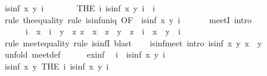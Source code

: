 \begin{isabellebody}
\ {\isachardoublequoteopen}is{\isacharunderscore}inf\ x\ y\ i{\isachardoublequoteclose}\isanewline
\ \ \ \ \isamarkupfalse%
\ \isamarkupfalse%
\ {\isachardoublequoteopen}{\isacharparenleft}THE\ i{\isachardot}\ is{\isacharunderscore}inf\ x\ y\ i{\isacharparenright}\ {\isacharequal}\ i{\isachardoublequoteclose}\isanewline
\ \ \ \ \ \ \isamarkupfalse%
\ {\isacharparenleft}rule\ the{\isacharunderscore}equality{\isacharparenright}\ {\isacharparenleft}rule\ is{\isacharunderscore}inf{\isacharunderscore}uniq\ {\isacharbrackleft}OF\ {\isacharunderscore}\ {\isacharbackquoteopen}is{\isacharunderscore}inf\ x\ y\ i{\isacharbackquoteclose}{\isacharbrackright}{\isacharparenright}\isanewline
\ \ \isamarkupfalse%
\isanewline
\isanewline
\ \ \isamarkupfalse%
\ meetI\ {\isacharbrackleft}intro{\isacharquery}{\isacharbrackright}{\isacharcolon}\isanewline
\ \ \ \ \ \ {\isachardoublequoteopen}i\ {\isasymsqsubseteq}\ x\ {\isasymLongrightarrow}\ i\ {\isasymsqsubseteq}\ y\ {\isasymLongrightarrow}\ {\isacharparenleft}{\isasymAnd}z{\isachardot}\ z\ {\isasymsqsubseteq}\ x\ {\isasymLongrightarrow}\ z\ {\isasymsqsubseteq}\ y\ {\isasymLongrightarrow}\ z\ {\isasymsqsubseteq}\ i{\isacharparenright}\ {\isasymLongrightarrow}\ x\ {\isasymsqinter}\ y\ {\isacharequal}\ i{\isachardoublequoteclose}\isanewline
\ \ \ \ \isamarkupfalse%
\ {\isacharparenleft}rule\ meet{\isacharunderscore}equality{\isacharcomma}\ rule\ is{\isacharunderscore}infI{\isacharparenright}\ blast{\isacharplus}\isanewline
\isanewline
\ \ \isamarkupfalse%
\ is{\isacharunderscore}inf{\isacharunderscore}meet\ {\isacharbrackleft}intro{\isacharquery}{\isacharbrackright}{\isacharcolon}\ {\isachardoublequoteopen}is{\isacharunderscore}inf\ x\ y\ {\isacharparenleft}x\ {\isasymsqinter}\ y{\isacharparenright}{\isachardoublequoteclose}\isanewline
\ \ \isamarkupfalse%
\ {\isacharparenleft}unfold\ meet{\isacharunderscore}def{\isacharparenright}\isanewline
\ \ \ \ \isamarkupfalse%
\ ex{\isacharunderscore}inf\ \isamarkupfalse%
\ i\ \ {\isachardoublequoteopen}is{\isacharunderscore}inf\ x\ y\ i{\isachardoublequoteclose}\ \isacommand{{\isachardot}{\isachardot}}\isamarkupfalse%
\isanewline
\ \ \ \ \isamarkupfalse%
\ \isamarkupfalse%
\ {\isachardoublequoteopen}is{\isacharunderscore}inf\ x\ y\ {\isacharparenleft}THE\ i{\isachardot}\ is{\isacharunderscore}inf\ x\ y\ i{\isacharparenright}{\isachardoublequoteclose}\isanewline
\ \ \ \ \ \ \isamarkupfalse%

\end{isabellebody}
